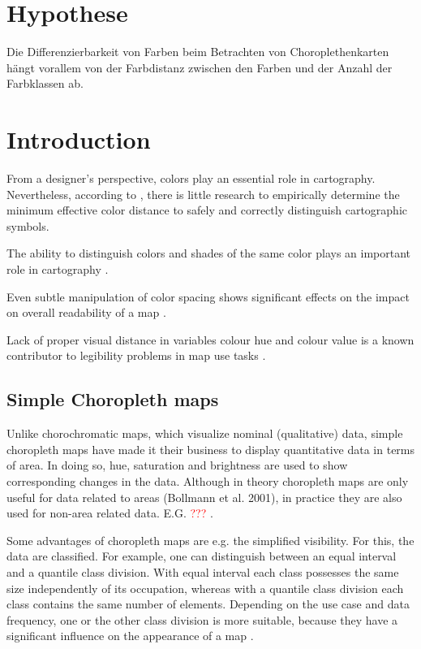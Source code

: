 \section{Hypothese}
Die Differenzierbarkeit von Farben beim Betrachten von Choroplethenkarten hängt vorallem von der Farbdistanz zwischen den Farben und der Anzahl der Farbklassen ab.

\section{Introduction}
From a designer's perspective, colors play an essential role in cartography. Nevertheless, according to \textcite{brychtovaC2017}, there is little research to empirically determine the minimum effective color distance to safely and correctly distinguish cartographic symbols. 

The ability to distinguish colors and shades of the same color plays an important role in cartography \parencite{coltekin2017}.

Even subtle manipulation of color spacing shows significant effects on the impact on overall readability of a map \parencite{brychtovaC2015, brychtovaV2014}. 

Lack of proper visual distance in variables colour hue and colour value is a known contributor to legibility problems in map use tasks \parencite{chesneau2007, steinrucken2013, stigmar2010}.

\subsection{Simple Choropleth maps}
Unlike chorochromatic maps, which visualize nominal (qualitative) data, simple choropleth maps have made it their business to display quantitative data in terms of area. In doing so, hue, saturation and brightness are used to show corresponding changes in the data. Although in theory choropleth maps are only useful for data related to areas (Bollmann et al. 2001), in practice they are also used for non-area related data. E.G. \textcolor{red}{???} \parencite{hruby2016, schiewe2015}.

Some advantages of choropleth maps are e.g. the simplified visibility. For this, the data are classified. For example, one can distinguish between an equal interval and a quantile class division. With equal interval each class possesses the same size independently of its occupation, whereas with a quantile class division each class contains the same number of elements. Depending on the use case and data frequency, one or the other class division is more suitable, because they have a significant influence on the appearance of a map \parencite{schiewe2015, rahlf2020}.

